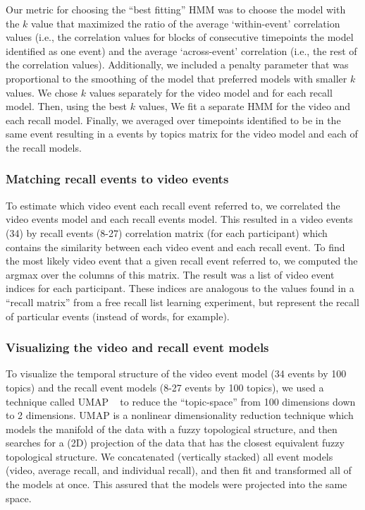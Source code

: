 \documentclass{article}
\begin{document}
Our metric for choosing the ``best fitting'' HMM was to choose the model with the $k$ value that maximized the ratio of the average `within-event' correlation values (i.e., the correlation values for blocks of consecutive timepoints the model identified as one event) and the average `across-event' correlation (i.e., the rest of the correlation values). Additionally, we included a penalty parameter that was proportional to the smoothing of the model that preferred models with smaller $k$ values. We chose $k$ values separately for the video model and for each recall model.  Then, using the best $k$ values, We fit a separate HMM for the video and each recall model. Finally, we averaged over timepoints identified to be in the same event resulting in a events by topics matrix for the video model and each of the recall models.

\subsubsection{Matching recall events to video events}
To estimate which video event each recall event referred to, we correlated the video events model and each recall events model. This resulted in a video events (34) by recall events (8-27) correlation matrix (for each participant) which contains the similarity between each video event and each recall event.  To find the most likely video event that a given recall event referred to, we computed the argmax over the columns of this matrix.  The result was a list of video event indices for each participant. These indices are analogous to the values found in a ``recall matrix'' from a free recall list learning experiment, but represent the recall of particular events (instead of words, for example).

\subsubsection{Visualizing the video and recall event models}
To visualize the temporal structure of the video event model (34 events by 100 topics) and the recall event models (8-27 events by 100 topics), we used a technique called UMAP ~\citep{McInHeal18} to reduce the ``topic-space'' from 100 dimensions down to 2 dimensions. UMAP is a nonlinear dimensionality reduction technique which models the manifold of the data with a fuzzy topological structure, and then searches for a (2D) projection of the data that has the closest equivalent fuzzy topological structure. We concatenated (vertically stacked) all event models (video, average recall, and individual recall), and then fit and transformed all of the models at once. This assured that the models were projected into the same space.
\end{document}
